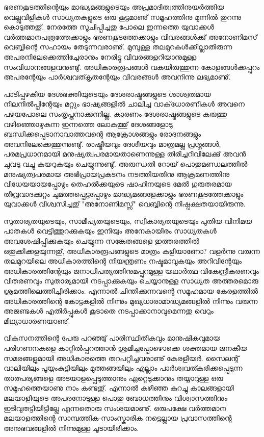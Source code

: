 ഭരണകൂടത്തിന്റെയും മാദ്ധ്യമങ്ങളുടെയും അപ്രമാദിത്വത്തിനുയര്‍ത്തിയ വെല്ലുവിളികള്‍ സാധ്യതകളുടെ ഒരു കൂട്ടമാണു് സമൂഹത്തിനു 
മുന്നില്‍ തുറന്നു കൊടുത്തതു്. നേരത്തേ സൂചിപ്പിച്ചതു പോലെ ഇന്നത്തെ യുവാക്കള്‍ വര്‍ത്തമാനപത്രത്തേക്കാളും ഭരണകൂടത്തേക്കാളും 
വിവരങ്ങള്‍ക്കു് അനോണിമസ് വെബ്ബിന്റെ സഹായം തേടുന്നവരാണു്. മുമ്പുള്ള തലമുറകള്‍ക്കില്ലാതിരുന്ന അപരനിലേക്കെത്തിച്ചേരാനും 
നേരിട്ടു വിവരങ്ങളറിയാനുമുള്ള സംവിധാനങ്ങളവനുണ്ടു്. അധികാരരൂപങ്ങള്‍ വകയിരുത്തുന്ന കോളങ്ങള്‍ക്കപ്പുറം അപരന്റേയും 
പാര്‍ശ്വവത്കൃതന്റേയും വിവരങ്ങള്‍ അവനിന്നു ലഭ്യമാണു്.

പാടിപ്പഴകിയ ദേശഭക്തിയുടെയും ദേശരാഷ്ട്രങ്ങളുടെ ശാശ്വതമായ നിലനില്‍പ്പിന്റേയും മറ്റും ഭാഷ്യങ്ങളില്‍ ചാലിച്ച വാക്‌ധോരണികള്‍ 
അവനെ പഴയപോലെ സംതൃപ്തനാക്കുന്നില്ല. കാരണം ദേശരാഷ്ട്രങ്ങളുടെ കരുത്തു വഴിഞ്ഞൊഴുകുന്ന ഇന്നത്തെ ലോകത്തു് 
ദേശങ്ങളോടു ബന്ധിക്കപ്പെടാനാവാത്തവന്റെ ആക്രോശങ്ങളും രോദനങ്ങളും അവനിലേക്കെത്തുന്നുണ്ടു്. രാഷ്ട്രീയവും ദേശീയവും 
മാത്രമല്ല പ്രശ്നങ്ങള്‍, പരമപ്രധാനമായി മനുഷ്യത്വപരമായതാണെന്നുള്ള തിരിച്ചറിവിലേക്കു് അവന്‍ ചുവടു വച്ചു കയറുകയും ചെയ്യുന്നുണ്ടു്.
 അരുന്ധതി റോയ് പൊതുമണ്ഡലത്തില്‍ മനുഷ്യത്വപരമായ അഭിപ്രായപ്രകടനം നടത്തിയതിനു ആക്രമണത്തിനു വിധേയയായപ്പോഴും 
തെഹല്‍ക്കയുടെ ഷാഹിനയുടെ മേല്‍ ഗുരുതരമായ തീവ്രവാദക്കുറ്റം ചുമത്തപ്പെട്ടപ്പോഴും മാദ്ധ്യമങ്ങളേക്കാളും ഭരണകൂടത്തേക്കാളും 
യുവാക്കള്‍ വിശ്വസിച്ചതു് "അനോണിമസ്സ്" വെബ്ബിന്റെ നിഷ്പക്ഷതയായിരുന്നു.

സുതാര്യതയുടെയും, സാമീപ്യതയുടെയും, സ്വീകാര്യതയുടെയും പുതിയ വിനിമയ പാതകള്‍ വെട്ടിത്തുറക്കുകയും ഇനിയും അനേകായിരം 
സാധ്യതകള്‍ അവശേഷിപ്പിക്കുകയും ചെയ്യുന്ന സങ്കേതങ്ങളെ ഇത്തരത്തില്‍ ഒതുക്കിക്കളയുന്നതു്, അധികാരരൂപങ്ങളുടെ മാത്രം 
കളിയാണോ? വളര്‍ന്നു വരുന്ന തലമുറയിലെ അധികാരത്തിന്റെ നിയന്ത്രണം നഷ്ടമാവുകയും അറിവിന്റേയും അധികാരത്തിന്റേയും
 ജനാധിപത്യത്തിനുമപ്പുറമുള്ള യഥാര്‍ത്ഥ വികേന്ദ്രീകരണവും വിതരണവും സുതാര്യമായി നടപ്പാക്കുകയും ചെയ്യാനുള്ള സാധ്യത 
അത്തരമൊരു ശ്രമത്തിലെത്തിച്ചിരിക്കാം. എന്നാല്‍ ചിന്തിക്കുന്നവന്റെ സമൂഹമായ കേരളത്തില്‍ അധികാരത്തിന്റെ കോട്ടകളില്‍ 
നിന്നും മുഖ്യധാരാമാദ്ധ്യമങ്ങളില്‍ നിന്നും വരുന്ന അജണ്ടകള്‍ എതിര്‍പ്പുകള്‍ കൂടാതെ നടപ്പാക്കാനാവുമെന്നതു വെറും മിഥ്യാധാരണയാണു്. ‌

വികസനത്തിന്റെ പേരു പറഞ്ഞു് പാരിസ്ഥിതികവും മാനുഷികവുമായ പരിഗണനകളെ കാറ്റില്‍പ്പറത്താന്‍ ശ്രമിച്ചപ്പോഴൊക്കെ 
ശക്തമായ ജനകീയ സമരങ്ങളുമായി അധികാരത്തെ തറപറ്റിച്ചവരാണു് കേരളീയര്‍. സൈലന്റ് വാലിയിലും പൂയ്യംകുട്ടിയിലും
 മുത്തങ്ങയിലും എല്ലാം പാര്‍ശ്വവത്കരിക്കപ്പെടുന്ന താത്പര്യങ്ങളെ അടയാളപ്പെടുത്താനും ഏറ്റെടുക്കാനും തയ്യാറുള്ള ഒരു 
സമൂഹത്തെയാണു നാം കണ്ടതു്. എന്നാല്‍ കഴിഞ്ഞ കുറച്ചു കാലങ്ങളായി മലയാളിയുടെ അപരനോടുള്ള പൊതു ബോധത്തിനും 
വിശ്വാസത്തിനും ഇടിവുതട്ടിയിട്ടില്ലേ എന്നതൊരു സംശയമാണു്. ഒരുപക്ഷേ വര്‍ത്തമാന മലയാളത്തിന്റെ സാമ്പത്തിക-സാംസ്കാരിക 
നട്ടെല്ലായ പ്രവാസത്തിന്റെ അനുഭവങ്ങളില്‍ നിന്നുമുള്ള ചൂടായിരിക്കാം.

